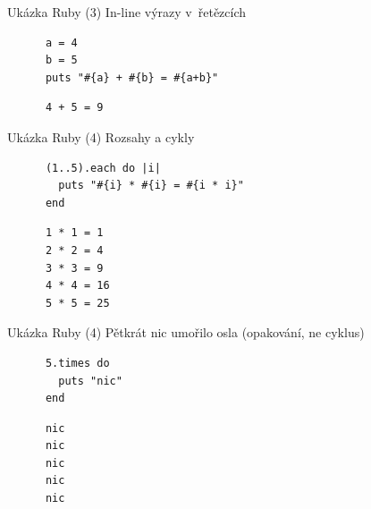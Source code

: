 \documentclass{beamer}
\begin{document}
\begin{frame}[fragile]{Ukázka Ruby (3)}
  In-line výrazy v~řetězcích
  \begin{block}{}
    \smallskip \footnotesize
    {\scriptsize \begin{verbatim}
      a = 4
      b = 5
      puts "#{a} + #{b} = #{a+b}"
    \end{verbatim}}
  \end{block}
  \pause
  \begin{block}{}
    \smallskip \footnotesize
    {\scriptsize \begin{verbatim}
      4 + 5 = 9
    \end{verbatim}}
  \end{block}
\end{frame}

\begin{frame}[fragile]{Ukázka Ruby (4)}
  Rozsahy a cykly
  \begin{block}{}
    \smallskip \footnotesize
    {\scriptsize \begin{verbatim}
      (1..5).each do |i|
        puts "#{i} * #{i} = #{i * i}"
      end
    \end{verbatim}}
  \end{block}
  \pause
  \begin{block}{}
    \smallskip \footnotesize
    {\scriptsize \begin{verbatim}
      1 * 1 = 1
      2 * 2 = 4
      3 * 3 = 9
      4 * 4 = 16
      5 * 5 = 25
    \end{verbatim}}
  \end{block}
\end{frame}


\begin{frame}[fragile]{Ukázka Ruby (4)}
  Pětkrát nic umořilo osla (opakování, ne cyklus)
  \begin{block}{}
    \smallskip \footnotesize
    {\scriptsize \begin{verbatim}
      5.times do
        puts "nic"
      end
    \end{verbatim}}
  \end{block}
  \pause
  \begin{block}{}
    \smallskip \footnotesize
    {\scriptsize \begin{verbatim}
      nic
      nic
      nic
      nic
      nic
    \end{verbatim}}
  \end{block}
\end{frame}
\end{document}
